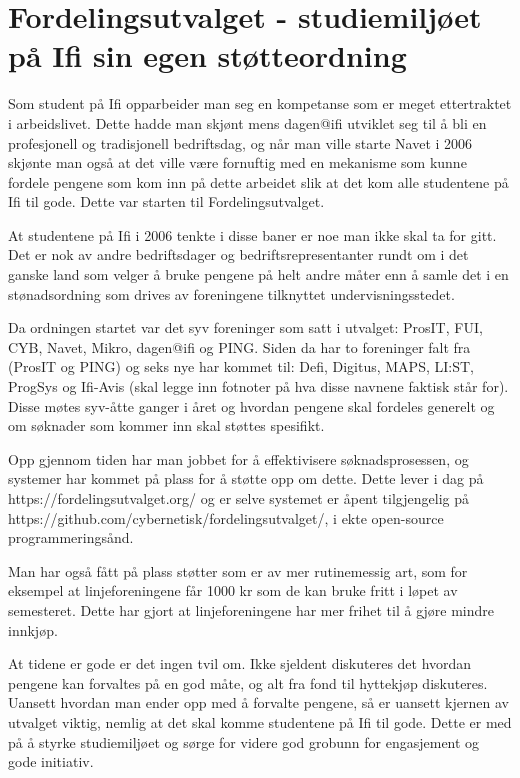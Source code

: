\chapter[Fordelingsutvalget]{Fordelingsutvalget - studiemiljøet på Ifi sin egen støtteordning}

\author{Skrevet av Arne Hassel og Nikolas Papaioannou}

Som student på Ifi opparbeider man seg en kompetanse som er meget ettertraktet i arbeidslivet. Dette hadde man skjønt mens dagen@ifi utviklet seg til å bli en profesjonell og tradisjonell bedriftsdag, og når man ville starte Navet i 2006 skjønte man også at det ville være fornuftig med en mekanisme som kunne fordele pengene som kom inn på dette arbeidet slik at det kom alle studentene på Ifi til gode. Dette var starten til Fordelingsutvalget.

At studentene på Ifi i 2006 tenkte i disse baner er noe man ikke skal ta for gitt. Det er nok av andre bedriftsdager og bedriftsrepresentanter rundt om i det ganske land som velger å bruke pengene på helt andre måter enn å samle det i en stønadsordning som drives av foreningene tilknyttet undervisningsstedet.

Da ordningen startet var det syv foreninger som satt i utvalget: ProsIT, FUI, CYB, Navet, Mikro, dagen@ifi og PING. Siden da har to foreninger falt fra (ProsIT og PING) og seks nye har kommet til: Defi, Digitus, MAPS, LI:ST, ProgSys og Ifi-Avis (skal legge inn fotnoter på hva disse navnene faktisk står for). Disse møtes syv-åtte ganger i året og hvordan pengene skal fordeles generelt og om søknader som kommer inn skal støttes spesifikt.

Opp gjennom tiden har man jobbet for å effektivisere søknadsprosessen, og systemer har kommet på plass for å støtte opp om dette. Dette lever i dag på https://fordelingsutvalget.org/ og er selve systemet er åpent tilgjengelig på https://github.com/cybernetisk/fordelingsutvalget/, i ekte open-source programmeringsånd.

Man har også fått på plass støtter som er av mer rutinemessig art, som for eksempel at linjeforeningene får 1000 kr som de kan bruke fritt i løpet av semesteret. Dette har gjort at linjeforeningene har mer frihet til å gjøre mindre innkjøp.

At tidene er gode er det ingen tvil om. Ikke sjeldent diskuteres det hvordan pengene kan forvaltes på en god måte, og alt fra fond til hyttekjøp diskuteres. Uansett hvordan man ender opp med å forvalte pengene, så er uansett kjernen av utvalget viktig, nemlig at det skal komme studentene på Ifi til gode. Dette er med på å styrke studiemiljøet og sørge for videre god grobunn for engasjement og gode initiativ.
